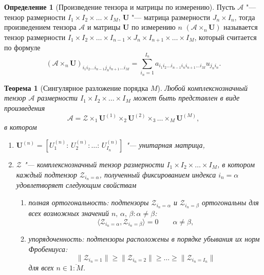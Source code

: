 \documentclass[specialist,
    substylefile = spbu_report.rtx,
    subf,href,colorlinks=true, 12pt]{disser}
\theoremstyle{plain}
\newtheorem{theorem}{Теорема}
\theoremstyle{definition}
\newtheorem{definition}{Определение}[section]
\theoremstyle{remark}
\begin{document}
    \begin{definition}[Произведение тензора и матрицы по измерению]
        Пусть $\mathcal A$ "--- тензор размерности $I_1\times I_2\times\ldots\times I_M$, $\mathbf U$
        "--- матрица размерности $J_n\times I_n$, тогда произведением тензора $\mathcal{A}$ и матрицы $\mathbf{U}$ по
        измерению $n$ $(\mathcal{A}\times_n \mathbf U)$ называется тензор размерности $I_1\times I_2\times\ldots\times I_{n-1}
        \times J_n\times I_{n+1}\times \ldots\times I_M$, который считается по формуле
        \[
            (\mathcal{A}\times_n \mathbf U)_{i_1 i_2\ldots i_{n-1}j_n i_{n+1}\ldots i_M} = \sum_{i_n=1}^{I_n} a_{i_1 i_2\ldots
            i_{n-1}i_n i_{n+1} \ldots i_M} u_{j_n i_n}.
        \]
    \end{definition}

    \begin{theorem}
    [Сингулярное разложение порядка $M$]
        Любой комплекснозначный тензор $\mathcal{A}$ размерности $I_1\times I_2 \times \ldots \times I_M$ может быть представлен
        в виде произведения
        \begin{equation}
            \mathcal{A} = \mathcal{Z} \times_1 \mathbf{U}^{(1)} \times_2 \mathbf{U}^{(2)} \times_3 \ldots \times_M \mathbf{U}^{(M)},\label{eq:hosvd}
        \end{equation}
        в котором
        \begin{enumerate}
            \item $\mathbf{U}^{(n)}=\left[U_1^{(n)}:\, U_2^{(n)}:\ldots:\, U_{I_n}^{(n)} \right]$ "--- унитарная матрица,
            \item $\mathcal{Z}$ "--- комплекснозначный тензор размерности $I_1\times I_2 \times \ldots \times I_M$, в котором
            каждый подтензор $\mathcal Z_{i_n=\alpha}$, полученный фиксированием индекса $i_n=\alpha$ удовлетворяет следующим свойствам
            \begin{enumerate}
                \item полная ортогональность: подтензоры $\mathcal Z_{i_n=\alpha}$ и $\mathcal Z_{i_n=\beta}$ ортогональны для всех возможных значений
                $n,\, \alpha,\, \beta: \alpha\ne\beta$:
                \[
                    \langle\mathcal Z_{i_n=\alpha},\mathcal Z_{i_n=\beta}\rangle=0 \qquad \alpha\ne\beta,
                \]
                \item упорядоченность: подтензоры расположены в порядке убывания их норм Фробениуса:
                \begin{equation}
                    \|\mathcal Z_{i_n=1}\|\geqslant\|\mathcal Z_{i_n=2}\| \geqslant \ldots \geqslant\|\mathcal Z_{i_n=I_n}\|\label{eq:order}
                \end{equation}
                для всех $n\in \overline{1:M}$.
            \end{enumerate}
        \end{enumerate}
    \end{theorem}
\end{document}
